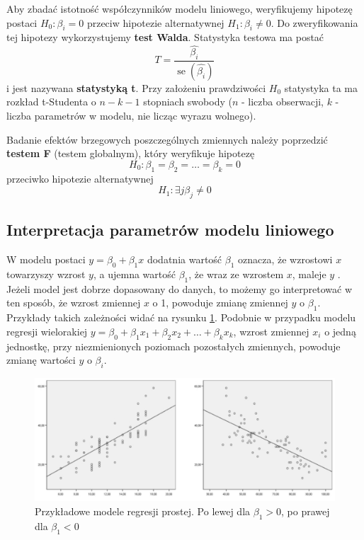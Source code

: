 \documentclass[12pt]{mwbk}
\theoremstyle{plain}
\theoremstyle{definition}
\theoremstyle{definition}
\newcommand\zrodlo[1]{\par\vspace{-3mm}{\small\textit{Źródło: }#1 }}
\begin{document}
Aby zbadać istotność współczynników modelu liniowego, weryfikujemy hipotezę postaci $H_0: \beta_i = 0$ przeciw hipotezie alternatywnej $H_1: \beta_i \neq 0.																																																																																																																																																																																																																																																																																																																																																																																																																																																																																																																													$ Do zweryfikowania tej hipotezy wykorzystujemy \textbf{test Walda}. Statystyka testowa ma postać $$T=\frac{\hat{\beta_i}}{\operatorname{se}(\hat{\beta_i})}$$ i jest nazywana \textbf{statystyką t}. Przy założeniu prawdziwości $H_0$ statystyka ta ma rozkład t-Studenta o $n-k-1$ stopniach swobody ($n$ - liczba obserwacji, $k$ - liczba parametrów w modelu, nie licząc wyrazu wolnego).

Badanie efektów brzegowych poszczególnych zmiennych należy poprzedzić \textbf{testem F} (testem globalnym), który weryfikuje hipotezę $$H_0: \beta_1=\beta_2=\ldots=\beta_k=0$$
 przeciwko hipotezie alternatywnej $$H_1: \exists{j} \beta_j \neq 0 $$

\subsection{Interpretacja parametrów modelu liniowego}

W modelu postaci $y=\beta_0 +\beta_1 x$ dodatnia wartość $\beta_1$ oznacza, że wzrostowi $x$ towarzyszy wzrost $y$, a ujemna wartość $\beta_1$, że wraz ze wzrostem $x$, maleje $y$ \cite{rozrzut}. Jeżeli model jest dobrze dopasowany do danych, to możemy go interpretować w ten sposób, że wzrost zmiennej $x$ o 1, powoduje zmianę zmiennej $y$ o $\beta_1$. Przykłady takich zależności widać na rysunku \ref{fig:regresje}. Podobnie w przypadku modelu regresji wielorakiej
$y=\beta_0+\beta_1 x_1+\beta_2 x_2 + \ldots + \beta_k x_k$,
wzrost zmiennej $x_i$ o jedną jednostkę, przy niezmienionych poziomach pozostałych zmiennych, powoduje zmianę wartości $y$ o $\beta_i$.

\begin{figure}[!h]
	\centering
	\includegraphics[width=\linewidth]{rys/regresje}
	\caption{Przykładowe modele regresji prostej. Po lewej dla $\beta_1>0$, po prawej dla $\beta_1<0$}
	\label{fig:regresje}
	\zrodlo{\cite{rozrzut}}
\end{figure}
\end{document}
